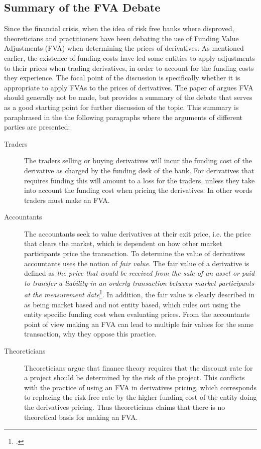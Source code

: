 \documentclass[../../../main.tex]{subfiles}
\begin{document}
    \subsection{Summary of the FVA Debate}
        Since the financial crisis, when the idea of risk free banks where disproved,
        theoreticians and practitioners have been debating the use of Funding Value Adjustments (FVA)
        when determining the prices of derivatives.
        As mentioned earlier, the existence of funding costs have led some entities 
        to apply adjustments to their prices when trading derivatives, 
        in order to account for the funding costs they experience.
        The focal point of the discussion is specifically 
        whether it is appropriate to apply FVAs to the prices of derivatives.
        The paper of \cite{HullWhiteFVA} argues FVA should generally not be made,
        but provides a summary of the debate that serves as a good starting point for further discussion of the topic.
        This summary is paraphrased in the the following paragraphs where the arguments of different parties are presented:

        \begin{description}
            \item[Traders] The traders selling or buying derivatives will incur the funding cost of the derivative as charged by the funding desk of the bank.
            For derivatives that requires funding this will amount to a loss for the traders,
            unless they take into account the funding cost when pricing the derivatives.
            In other words traders must make an FVA. 
            \item[Accountants] The accountants seek to value derivatives at their exit price, i.e. the price that clears the market,
            which is dependent on how other market participants price the transaction.
            To determine the value of derivatives accountants uses the notion of \textit{fair value}.
            The fair value of a derivative is defined as \textit{the price that would be received from the sale of an asset or paid to transfer a liability in an orderly transaction between market participants at the measurement date}\footcite{IFRS13}.
            In addition, the fair value is clearly described in \cite{IFRS13} as being market based and not entity based,
            which rules out using the entity specific funding cost when evaluating prices.
            From the accountants point of view making an FVA can lead to multiple fair values for the same transaction,
            why they oppose this practice.
            \item[Theoreticians] Theoreticians argue that finance theory requires that the discount rate for a project should be determined by the risk of the project.
            This conflicts with the practice of using an FVA in derivatives pricing,
            which corresponds to replacing the risk-free rate by the higher funding cost of the entity doing the derivatives pricing.
            Thus theoreticians claims that there is no theoretical basis for making an FVA.
        \end{description}
\end{document}
